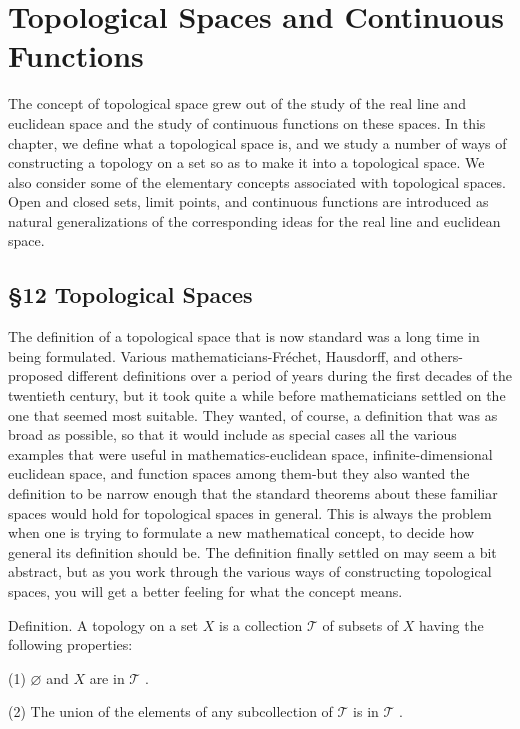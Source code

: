 \chapter{Topological Spaces and Continuous Functions}

The concept of topological space grew out of the study of the real line and euclidean space and the study of continuous functions on these spaces. In this chapter, we define what a topological space is, and we study a number of ways of constructing a topology on a set so as to make it into a topological space. We also consider some of the elementary concepts associated with topological spaces. Open and closed sets, limit points, and continuous functions are introduced as natural generalizations of the corresponding ideas for the real line and euclidean space.

\section*{§12 Topological Spaces}

The definition of a topological space that is now standard was a long time in being formulated. Various mathematicians-Fréchet, Hausdorff, and others-proposed different definitions over a period of years during the first decades of the twentieth century, but it took quite a while before mathematicians settled on the one that seemed most suitable. They wanted, of course, a definition that was as broad as possible, so that it would include as special cases all the various examples that were useful in mathematics-euclidean space, infinite-dimensional euclidean space, and function spaces among them-but they also wanted the definition to be narrow enough that the standard theorems about these familiar spaces would hold for topological spaces in general. This is always the problem when one is trying to formulate a new mathematical concept, to decide how general its definition should be. The definition finally settled on may seem a bit abstract, but as you work through the various ways of constructing topological spaces, you will get a better feeling for what the concept means.

Definition. A topology on a set \(X\) is a collection \(\mathcal{T}\) of subsets of \(X\) having the following properties:

(1) \(\varnothing\) and \(X\) are in \(\mathcal{T}\) .

(2) The union of the elements of any subcollection of \(\mathcal{T}\) is in \(\mathcal{T}\) .


